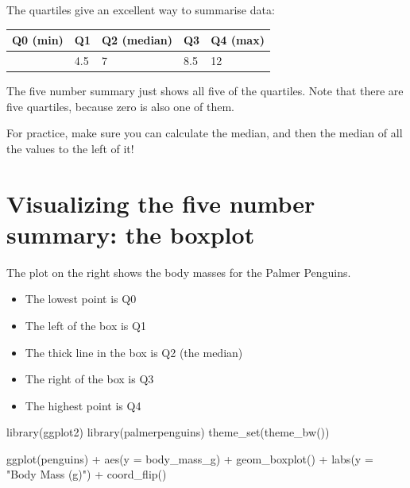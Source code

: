 \documentclass[
  letterpaper,
  DIV=11,
  numbers=noendperiod]{scrreprt}
\newenvironment{Shaded}{\begin{snugshade}}{\end{snugshade}}
\newcommand{\AttributeTok}[1]{\textcolor[rgb]{0.40,0.45,0.13}{#1}}
\newcommand{\FunctionTok}[1]{\textcolor[rgb]{0.28,0.35,0.67}{#1}}
\newcommand{\NormalTok}[1]{\textcolor[rgb]{0.00,0.23,0.31}{#1}}
\newcommand{\SpecialCharTok}[1]{\textcolor[rgb]{0.37,0.37,0.37}{#1}}
\newcommand{\StringTok}[1]{\textcolor[rgb]{0.13,0.47,0.30}{#1}}
\providecommand{\tightlist}{%
  \setlength{\itemsep}{0pt}\setlength{\parskip}{0pt}}\usepackage{longtable,booktabs,array}
\begin{document}
The quartiles give an excellent way to summarise data:

\begin{longtable}[]{@{}lllll@{}}
\toprule\noalign{}
Q0 (min) & Q1 & Q2 (median) & Q3 & Q4 (max) \\
\midrule\noalign{}
\endhead
\bottomrule\noalign{}
\endlastfoot
1 & 4.5 & 7 & 8.5 & 12 \\
\end{longtable}

The five number summary just shows all five of the quartiles. Note that
there are five quartiles, because zero is also one of them.

For practice, make sure you can calculate the median, and then the
median of all the values to the left of it!

\hypertarget{visualizing-the-five-number-summary-the-boxplot}{%
\section{Visualizing the five number summary: the
boxplot}\label{visualizing-the-five-number-summary-the-boxplot}}

\vspace{1cm}

The plot on the right shows the body masses for the Palmer Penguins.

\pspace

\begin{itemize}
\tightlist
\item
  The lowest point is Q0
\item
  The left of the box is Q1
\item
  The thick line in the box is Q2 (the median)
\item
  The right of the box is Q3
\item
  The highest point is Q4
\end{itemize}

\begin{Shaded}
\begin{Highlighting}[]
\FunctionTok{library}\NormalTok{(ggplot2)}
\FunctionTok{library}\NormalTok{(palmerpenguins)}
\FunctionTok{theme\_set}\NormalTok{(}\FunctionTok{theme\_bw}\NormalTok{())}

\FunctionTok{ggplot}\NormalTok{(penguins) }\SpecialCharTok{+} 
    \FunctionTok{aes}\NormalTok{(}\AttributeTok{y =}\NormalTok{ body\_mass\_g) }\SpecialCharTok{+}
    \FunctionTok{geom\_boxplot}\NormalTok{() }\SpecialCharTok{+}
    \FunctionTok{labs}\NormalTok{(}\AttributeTok{y =} \StringTok{"Body Mass (g)"}\NormalTok{) }\SpecialCharTok{+}
    \FunctionTok{coord\_flip}\NormalTok{()}
\end{Highlighting}
\end{Shaded}
\end{document}
